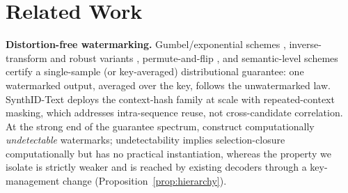 \documentclass{article} %
\begin{document}
\section{Related Work}\label{sec:related}
\textbf{Distortion-free watermarking.}
Gumbel/exponential schemes \citep{aaronson2023}, inverse-transform and robust
variants \citep{kuditipudi2023robust}, permute-and-flip
\citep{zhao2024permute}, and semantic-level schemes \citep{pmark2025} certify
a single-sample (or key-averaged) distributional guarantee: one watermarked
output, averaged over the key, follows the unwatermarked law. SynthID-Text
\citep{dathathri2024scalable} deploys the context-hash family at scale with
repeated-context masking, which addresses intra-sequence reuse, not
cross-candidate correlation. At the strong end of the guarantee spectrum,
\citet{christ2023undetectable} construct computationally \emph{undetectable}
watermarks; undetectability implies selection-closure computationally but has
no practical instantiation, whereas the property we isolate is strictly
weaker and is reached by existing decoders through a key-management change
(Proposition~\ref{prop:hierarchy}).
\end{document}
